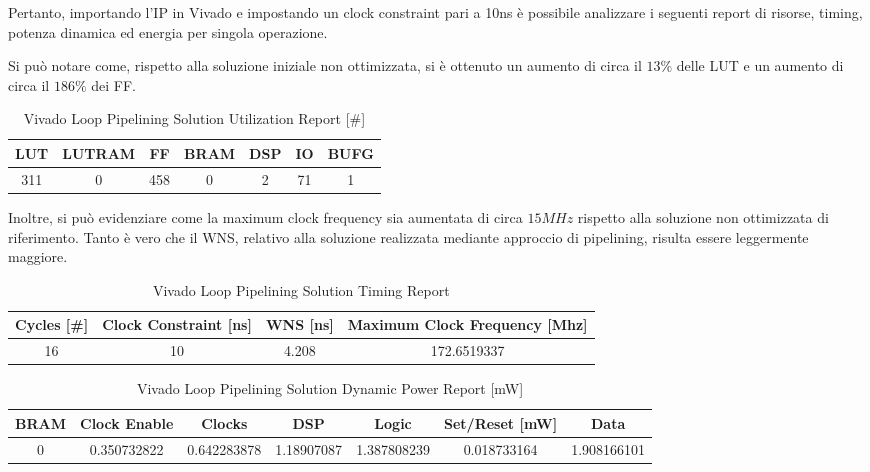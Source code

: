 Pertanto, importando l'IP in Vivado e impostando un clock constraint pari a 10ns è possibile analizzare i seguenti report di risorse, timing, potenza dinamica ed energia per singola operazione.


Si può notare come, rispetto alla soluzione iniziale non ottimizzata, si è ottenuto un aumento di circa il $13\%$ delle LUT e un aumento di circa il $186\%$ dei FF.

\begin{table}[H]
    \centering
    \begin{tabular}{|c|c|c|c|c|c|c|}
        \hline
        \textbf{LUT} & \textbf{LUTRAM} & \textbf{FF} & \textbf{BRAM} & \textbf{DSP} & \textbf{IO} & \textbf{BUFG} \\
        \hline
        311 & 0 & 458 & 0 & 2 & 71 & 1 \\
        \hline
    \end{tabular}
    \caption{Vivado Loop Pipelining Solution Utilization Report [\#]}
    \label{tab:vivado-loop-pipelining-solution-utilization-reproot}
\end{table}

Inoltre, si può evidenziare come la maximum clock frequency sia aumentata di circa $15 MHz$ rispetto alla soluzione non ottimizzata di riferimento. Tanto è vero che il WNS, relativo alla soluzione realizzata mediante approccio di pipelining, risulta essere leggermente maggiore.

\begin{table}[H]
    \centering
    \begin{tabular}{|c|c|c|c|}
        \hline
        \textbf{Cycles} [\#] & \textbf{Clock Constraint} [ns] & \textbf{WNS} [ns] & \textbf{Maximum Clock Frequency} [Mhz] \\
        \hline
        16 & 10 & 4.208 & 172.6519337 \\
        \hline
    \end{tabular}
    \caption{Vivado Loop Pipelining Solution Timing Report}
    \label{tab:vivado-loop-pipelining-solution-timing-reproot}
\end{table}

\begin{table}[H]
    \centering
    \begin{tabular}{|c|c|c|c|c|c|c|}
        \hline
        \textbf{BRAM} & \textbf{Clock Enable} & \textbf{Clocks} & \textbf{DSP} & \textbf{Logic} & \textbf{Set/Reset} [mW] & \textbf{Data} \\
        \hline
        0 & 0.350732822 & 0.642283878 & 1.18907087 & 1.387808239 & 0.018733164 & 1.908166101 \\
        \hline
    \end{tabular}
    \caption{Vivado Loop Pipelining Solution Dynamic Power Report [mW]}
    \label{tab:vivado-loop-pipelining-solution-dynamic-power-reproot}
\end{table}

